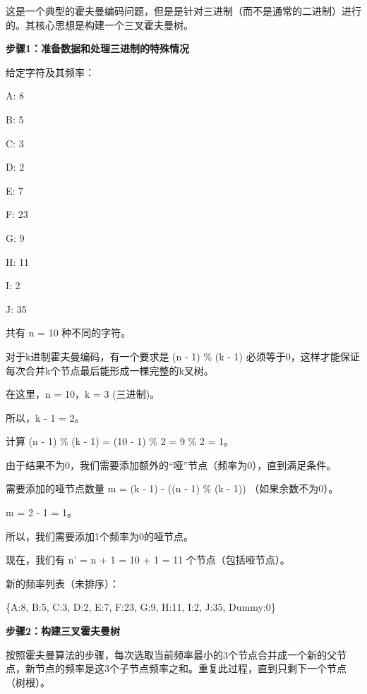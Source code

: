 这是一个典型的霍夫曼编码问题，但是是针对三进制（而不是通常的二进制）进行的。其核心思想是构建一个三叉霍夫曼树。

\textbf{步骤1：准备数据和处理三进制的特殊情况}

给定字符及其频率：

A: 8

B: 5

C: 3

D: 2

E: 7

F: 23

G: 9

H: 11

I: 2

J: 35

共有 n = 10 种不同的字符。

对于k进制霍夫曼编码，有一个要求是 (n - 1) \% (k - 1) 必须等于0，这样才能保证每次合并k个节点最后能形成一棵完整的k叉树。

在这里，n = 10，k = 3 (三进制)。

所以，k - 1 = 2。

计算 (n - 1) \% (k - 1) = (10 - 1) \% 2 = 9 \% 2 = 1。

由于结果不为0，我们需要添加额外的“哑”节点（频率为0），直到满足条件。

需要添加的哑节点数量 m = (k - 1) - ((n - 1) \% (k - 1)) （如果余数不为0）。

m = 2 - 1 = 1。

所以，我们需要添加1个频率为0的哑节点。

现在，我们有 n' = n + 1 = 10 + 1 = 11 个节点（包括哑节点）。

新的频率列表（未排序）：

\{A:8, B:5, C:3, D:2, E:7, F:23, G:9, H:11, I:2, J:35, Dummy:0\}

\textbf{步骤2：构建三叉霍夫曼树}

按照霍夫曼算法的步骤，每次选取当前频率最小的3个节点合并成一个新的父节点，新节点的频率是这3个子节点频率之和。重复此过程，直到只剩下一个节点（树根）。

